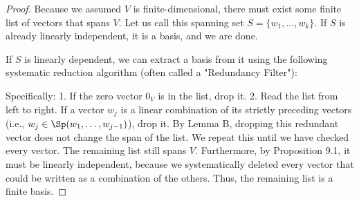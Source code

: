\begin{proof}
Because we assumed $V$ is finite-dimensional, there must exist some finite list of vectors that spans $V$. Let us call this spanning set $S = \{w_1, \dots, w_k\}$. If $S$ is already linearly independent, it is a basis, and we are done.

If $S$ is linearly dependent, we can extract a basis from it using the following systematic reduction algorithm (often called a "Redundancy Filter"):

\begin{center}
\end{center}

Specifically:
1. If the zero vector $0_V$ is in the list, drop it.
2. Read the list from left to right. If a vector $w_j$ is a linear combination of its strictly preceding vectors (i.e., $w_j \in \Sp(w_1, \dots, w_{j-1})$), drop it. 
By Lemma B, dropping this redundant vector does not change the span of the list. We repeat this until we have checked every vector. The remaining list still spans $V$. Furthermore, by Proposition 9.1, it must be linearly independent, because we systematically deleted every vector that could be written as a combination of the others. Thus, the remaining list is a finite basis.
\end{proof}

